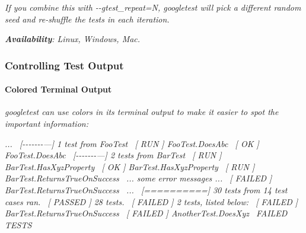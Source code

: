 {\itshape If you combine this with {\ttfamily -\/-\/gtest\+\_\+repeat=N}, googletest will pick a different random seed and re-\/shuffle the tests in each iteration.}

{\itshape {\bfseries Availability}\+: Linux, Windows, Mac.}

{\itshape \subsubsection*{Controlling Test Output}}

{\itshape }

{\itshape \paragraph*{Colored Terminal Output}}

{\itshape }

{\itshape googletest can use colors in its terminal output to make it easier to spot the important information\+:}

{\itshape ...~\newline
 \mbox{[}-\/-\/-\/-\/-\/-\/-\/---\mbox{]} 1 test from Foo\+Test~\newline
 \mbox{[} R\+UN \mbox{]} Foo\+Test.\+Does\+Abc~\newline
 \mbox{[} OK \mbox{]} Foo\+Test.\+Does\+Abc~\newline
 \mbox{[}-\/-\/-\/-\/-\/-\/-\/---\mbox{]} 2 tests from Bar\+Test~\newline
 \mbox{[} R\+UN \mbox{]} Bar\+Test.\+Has\+Xyz\+Property~\newline
 \mbox{[} OK \mbox{]} Bar\+Test.\+Has\+Xyz\+Property~\newline
 \mbox{[} R\+UN \mbox{]} Bar\+Test.\+Returns\+True\+On\+Success~\newline
 ... some error messages ...~\newline
 \mbox{[} F\+A\+I\+L\+ED \mbox{]} Bar\+Test.\+Returns\+True\+On\+Success~\newline
 ...~\newline
 \mbox{[}==========\mbox{]} 30 tests from 14 test cases ran.~\newline
 \mbox{[} P\+A\+S\+S\+ED \mbox{]} 28 tests.~\newline
 \mbox{[} F\+A\+I\+L\+ED \mbox{]} 2 tests, listed below\+:~\newline
 \mbox{[} F\+A\+I\+L\+ED \mbox{]} Bar\+Test.\+Returns\+True\+On\+Success~\newline
 \mbox{[} F\+A\+I\+L\+ED \mbox{]} Another\+Test.\+Does\+Xyz~ F\+A\+I\+L\+ED T\+E\+S\+TS}

